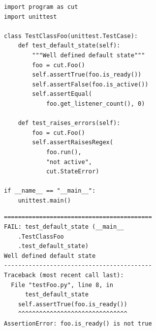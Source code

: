 \begin{frame}[fragile]
%
\vspace{-9pt}
\begin{tcbraster}[raster columns=2,
                  raster equal height,
                  nobeforeafter,
                  raster column skip=0.1cm]
\begin{codebox}[testFoo.py]
\begin{verbatim}
import program as cut
import unittest

class TestClassFoo(unittest.TestCase):
    def test_default_state(self):
        """Well defined default state"""
        foo = cut.Foo()
        self.assertTrue(foo.is_ready())
        self.assertFalse(foo.is_active())
        self.assertEqual(
            foo.get_listener_count(), 0)

    def test_raises_errors(self):
        foo = cut.Foo()
        self.assertRaisesRegex(
            foo.run(),
            "not active", 
            cut.StateError)

if __name__ == "__main__":
    unittest.main()
\end{verbatim}
\end{codebox}
%
\begin{cmdbox}[Output]
\begin{verbatim}
==========================================
FAIL: test_default_state (__main__
    .TestClassFoo
    .test_default_state)
Well defined default state
------------------------------------------
Traceback (most recent call last):
  File "testFoo.py", line 8, in 
      test_default_state
    self.assertTrue(foo.is_ready())
    ^^^^^^^^^^^^^^^^^^^^^^^^^^^^^^^
AssertionError: foo.is_ready() is not true
\end{verbatim}
\end{cmdbox}
\end{tcbraster}
%
\end{frame}


